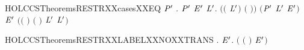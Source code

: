 \begin{SaveVerbatim}{HOLCCSTheoremsRESTRXXcasesXXEQ}
\HOLTokenTurnstile{} \HOLSymConst{\HOLTokenForall{}}\ensuremath{\HOLBoundVar{P}\sp{\prime}}   .
          \HOLTokenTransBegin{}\HOLTokenTransEnd \ensuremath{\HOLBoundVar{P}\sp{\prime}} \HOLSymConst{\HOLTokenEquiv{}}
       \HOLSymConst{\HOLTokenExists{}} \ensuremath{\HOLBoundVar{E}\sp{\prime}}  \ensuremath{\HOLBoundVar{L}\sp{\prime}}.
           \ensuremath{(}\ensuremath{(} \HOLSymConst{\ensuremath{=}} \ensuremath{\HOLBoundVar{L}\sp{\prime}}\ensuremath{)} \HOLSymConst{\HOLTokenConj{}} \ensuremath{(} \HOLSymConst{\ensuremath{=}} \ensuremath{)}\ensuremath{)} \HOLSymConst{\HOLTokenConj{}} \ensuremath{(}\ensuremath{\HOLBoundVar{P}\sp{\prime}} \HOLSymConst{\ensuremath{=}}  \ensuremath{\HOLBoundVar{L}\sp{\prime}} \ensuremath{\HOLBoundVar{E}\sp{\prime}}\ensuremath{)} \HOLSymConst{\HOLTokenConj{}}  \HOLTokenTransBegin{}\HOLTokenTransEnd \ensuremath{\HOLBoundVar{E}\sp{\prime}} \HOLSymConst{\HOLTokenConj{}}
           \ensuremath{(}\ensuremath{(} \HOLSymConst{\ensuremath{=}} \HOLConst{\ensuremath{\tau}}\ensuremath{)} \HOLSymConst{\HOLTokenDisj{}} \ensuremath{(} \HOLSymConst{\ensuremath{=}}  \ensuremath{)} \HOLSymConst{\HOLTokenConj{}}  \HOLConst{\HOLTokenNotIn{}} \ensuremath{\HOLBoundVar{L}\sp{\prime}} \HOLSymConst{\HOLTokenConj{}}   \HOLConst{\HOLTokenNotIn{}} \ensuremath{\HOLBoundVar{L}\sp{\prime}}\ensuremath{)}
\end{SaveVerbatim}
\newcommand{\HOLCCSTheoremsRESTRXXcasesXXEQ}{\UseVerbatim{HOLCCSTheoremsRESTRXXcasesXXEQ}}
\begin{SaveVerbatim}{HOLCCSTheoremsRESTRXXLABELXXNOXXTRANS}
\HOLTokenTurnstile{} \HOLSymConst{\HOLTokenForall{}} .
        \HOLConst{\HOLTokenIn{}}  \HOLSymConst{\HOLTokenDisj{}}   \HOLConst{\HOLTokenIn{}}  \HOLSymConst{\HOLTokenImp{}} \HOLSymConst{\HOLTokenForall{}}  \ensuremath{\HOLBoundVar{E}\sp{\prime}}. \HOLSymConst{\HOLTokenNeg{}}\ensuremath{(}  \ensuremath{(} \HOLSymConst{\ensuremath{\ldotp}}\ensuremath{)} \HOLTokenTransBegin{}\HOLTokenTransEnd \ensuremath{\HOLBoundVar{E}\sp{\prime}}\ensuremath{)}
\end{SaveVerbatim}
